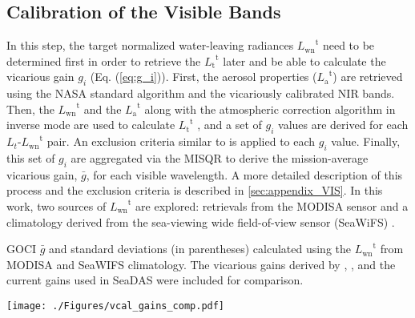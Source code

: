 \documentclass[]{interact}
\theoremstyle{plain}%
\theoremstyle{definition}
\theoremstyle{remark}
\begin{document}
\subsection{Calibration of the Visible Bands}
\label{sec:vcal_vis}
In this step, the target normalized water-leaving radiances ${L_\text{wn}}^\text{t}$ need to be determined first in order to retrieve the  ${L_\text{t}}^\text{t}$ later and be able to calculate the vicarious gain $g_i$ (Eq. (\ref{eq:g_i})). First, the aerosol properties (${L_\text{a}}^\text{t}$) are retrieved using the NASA standard algorithm \citep{Mobley2016} and the vicariously calibrated NIR bands. Then, the ${L_\text{wn}}^\text{t}$ and the ${L_\text{a}}^\text{t}$ along with the atmospheric correction algorithm in inverse mode are used to calculate ${L_\text{t}}^\text{t}$ \citep{Franz:07}, and a set of $g_i$ values are derived for each $L_t$-${L_\text{wn}}^\text{t}$ pair. An exclusion criteria similar to \cite{Bailey2006} is applied to each $g_i$ value. Finally, this set of $g_i$ are aggregated via the MISQR to derive the mission-average vicarious gain, $\bar{g}$, for each visible wavelength. A more detailed description of this process and the exclusion criteria is described in \autoref{sec:appendix_VIS}. In this work, two sources of ${L_\text{wn}}^\text{t}$ are explored: retrievals from the MODISA sensor and a climatology derived from the sea-viewing wide field-of-view sensor (SeaWiFS) \citep{McClain2004}. 

\begin{table}[htbp!]
\caption{GOCI $\bar{g}$ and standard deviations (in parentheses) calculated using the ${L_\text{wn}}^\text{t}$ from MODISA and SeaWIFS climatology. The vicarious gains derived by \cite{Wang:13}, \cite{Ahn2015}, and the current gains used in SeaDAS were included for comparison. \label{tab:vcal_gains_comp}}

  \centering
    \texttt{[image: ./Figures/vcal\_gains\_comp.pdf]}

\end{table}
\end{document}
